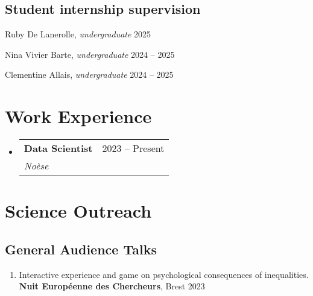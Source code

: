 \documentclass[letterpaper,11pt]{article}
\makeatletter
\newcommand{\resumeItem}[1]{
  \item\small{
    {#1 \vspace{-2pt}}
  }
}
\newcommand{\resumeItemWithYear}[3][ ]{ %
  \item\small{
    #2 \hfill {\small #3} \\
    #1
  }
}
\newcommand{\resumeSubheading}[4]{
  \vspace{1pt}\item
    \begin{tabular*}{0.97\textwidth}[t]{l@{\extracolsep{\fill}}r}
      \textbf{#1} & #2 \\
      \textit{\small#3} & \textit{\small #4} \\
    \end{tabular*}\vspace{-7pt}
}
\newcommand{\resumeSubSubheading}[2]{
    \item
    \begin{tabular*}{0.97\textwidth}{l@{\extracolsep{\fill}}r}
      \textit{\small#1} & \textit{\small #2} \\
    \end{tabular*}\vspace{-7pt}
}
\newcommand{\resumePublicationHeading}[1]{
  \vspace{5pt} %
  \noindent\textbf{\small #1} %
  \vspace{2pt} %
}
\newcommand{\resumeSubHeadingListStart}{\begin{itemize}[leftmargin=0.15in, label={}]}
\newcommand{\resumeSubHeadingListEnd}{\end{itemize}}
\newcommand{\resumeItemListStart}{\begin{itemize}}
\newcommand{\resumeItemListEnd}{\end{itemize}\vspace{-5pt}}
\makeatother
\begin{document}
\subsection*{Student internship supervision}

\begin{etaremune}
    \resumeItemWithYear{Ruby De Lanerolle, \textit{undergraduate}}{2025}
    \resumeItemWithYear{Nina Vivier Barte, \textit{undergraduate}}{2024 -- 2025}
    \resumeItemWithYear{Clementine Allais, \textit{undergraduate}}{2024 -- 2025}
\end{etaremune}

\section{Work Experience}
  \resumeSubHeadingListStart

    \resumeSubheading
      {Data Scientist}{2023 -- Present}
      {Noèse}{}

      
  \resumeSubHeadingListEnd


\section{Science Outreach}
\subsection*{General Audience Talks}
\begin{enumerate}
    \resumeItemWithYear{Interactive experience and game on psychological consequences of inequalities. \textbf{Nuit Européenne des Chercheurs}, Brest}{2023}
\end{enumerate}

\end{document}
